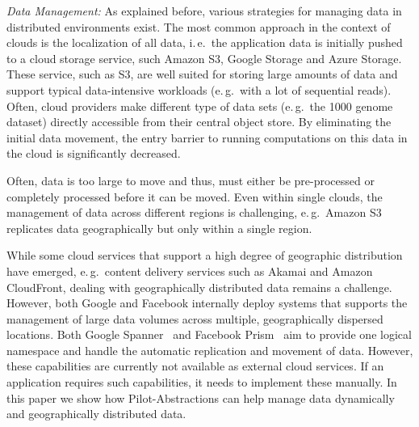 \documentclass[times]{cpeauth}
\newcommand{\pilot}{Pilot\xspace}
\begin{document}

{\it Data Management:} As explained before, various strategies for
managing data in distributed environments exist. The most common
approach in the context of clouds is the localization of all data,
i.\,e.\ the application data is initially pushed to a cloud storage
service, such Amazon S3, Google Storage and Azure Storage.  These
service, such as S3, are well suited for storing large amounts of data
and support typical data-intensive workloads (e.\,g.\ with a lot of
sequential reads). Often, cloud providers make different type of data
sets (e.\,g.\ the 1000 genome dataset) directly accessible from their
central object store. By eliminating the initial data movement, the
entry barrier to running computations on this data in the cloud is
significantly decreased.

Often, data is too large to move and thus, must either be
pre-processed or completely processed before it can be moved. Even within
single clouds, the management of data across different regions is challenging, 
e.\,g.\ Amazon S3  replicates data geographically but only within a single
region.

While some cloud services that support a high degree of geographic
distribution have emerged, e.\,g.\ content delivery services such as
Akamai and Amazon CloudFront, dealing with geographically distributed
data remains a challenge. However, both Google and Facebook internally
deploy systems that supports the management of large data volumes
across multiple, geographically dispersed locations. Both Google
Spanner~\cite{dean09} and Facebook Prism~\cite{Metz12} aim to provide
one logical namespace and handle the automatic replication and
movement of data. However, these capabilities are currently not
available as external cloud services. If an application requires such
capabilities, it needs to implement these manually.  In this paper we
show how \pilot-Abstractions can help manage data dynamically and
geographically distributed data.
\end{document}
